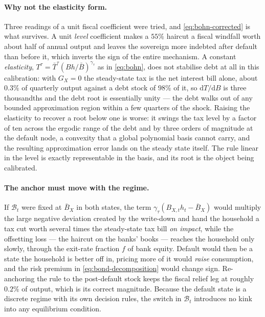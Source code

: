 \paragraph{Why not the elasticity form.} Three readings of a unit fiscal
coefficient were tried, and \eqref{eq:bohn-corrected} is what survives. A unit
\emph{level} coefficient makes a $55\%$ haircut a fiscal windfall worth about
half of annual output and leaves the sovereign more indebted after default than
before it, which inverts the sign of the entire mechanism. A constant
\emph{elasticity}, $T^{\tau}=\bar T^{\tau}(B h/\bar B)^{\gamma_\tau}$ as in
\eqref{eq:bohn}, does not stabilise debt at all in this calibration: with
$G_X=0$ the steady-state tax is the net interest bill alone, about $0.3\%$ of
quarterly output against a debt stock of $98\%$ of it, so $\mathrm{d}T/\mathrm{d}B$
is three thousandths and the debt root is essentially unity --- the debt walks
out of any bounded approximation region within a few quarters of the shock.
Raising the elasticity to recover a root below one is worse: it swings the tax
level by a factor of ten across the ergodic range of the debt and by three orders
of magnitude at the default node, a convexity that a global polynomial basis
cannot carry, and the resulting approximation error lands on the steady state
itself. The rule linear in the level is exactly representable in the basis, and
its root is the object being calibrated.

\paragraph{The anchor must move with the regime.} If $\mathcal{B}_t$ were fixed at
$\bar B_X$ in both states, the term $\gamma_\tau(B_{X,t}h_t-\bar B_X)$ would
multiply the large negative deviation created by the write-down and hand the
household a tax cut worth several times the steady-state tax bill \emph{on
impact}, while the offsetting loss --- the haircut on the banks' books --- reaches
the household only slowly, through the exit-rate fraction $f$ of bank equity.
Default would then be a state the household is better off in, pricing more of it
would \emph{raise} consumption, and the risk premium in
\eqref{eq:bond-decomposition} would change sign. Re-anchoring the rule to the
post-default stock keeps the fiscal relief leg at roughly $0.2\%$ of output,
which is its correct magnitude. Because the default state is a discrete regime
with its own decision rules, the switch in $\mathcal{B}_t$ introduces no
kink into any equilibrium condition.


